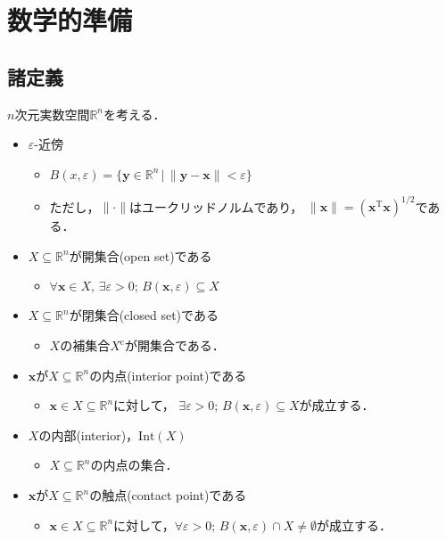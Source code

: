 \documentclass{jsreport}
\begin{document}
\chapter{数学的準備}
\section{諸定義}
$n$次元実数空間$\mathbb{R}^n$を考える．
\begin{itemize}
  \item $\varepsilon$-近傍
  \begin{itemize}
    \item $B(x, \varepsilon) = \{\bm{y} \in \mathbb{R}^n \, | \, \|\bm{y} - \bm{x} \| < \varepsilon\}$
    \item ただし，$\|\cdot\|$はユークリッドノルムであり，
    $\|\bm{x}\| = (\bm{x}^{\mathrm{T}}\bm{x})^{1/2}$である．
  \end{itemize}
  \item $X \subseteq \mathbb{R}^n$が開集合(open set)である
  \begin{itemize}
    \item $\forall \bm{x} \in X, \, \exists \varepsilon > 0; \, B(\bm{x}, \varepsilon) \subseteq X$
  \end{itemize}
  \item $X \subseteq \mathbb{R}^n$が閉集合(closed set)である
  \begin{itemize}
    \item $X$の補集合$X^\mathrm{c}$が開集合である．
  \end{itemize}
  \item $\bm{x}$が$X \subseteq \mathbb{R}^n$の内点(interior point)である
  \begin{itemize}
    \item $\bm{x} \in X \subseteq \mathbb{R}^n$に対して，
    $\exists \varepsilon > 0; \, B(\bm{x}, \varepsilon) \subseteq X$が成立する．
  \end{itemize}
  \item $X$の内部(interior)，$\mathrm{Int}(X)$
  \begin{itemize}
    \item $X \subseteq \mathbb{R}^n$の内点の集合．
  \end{itemize}
  \item $\bm{x}$が$X \subseteq \mathbb{R}^n$の触点(contact point)である
  \begin{itemize}
    \item $\bm{x} \in X \subseteq \mathbb{R}^n$に対して，$\forall \varepsilon > 0; \, B(\bm{x}, \varepsilon) \cap X \neq \emptyset$が成立する．

\end{itemize}
\end{itemize}
\end{document}
